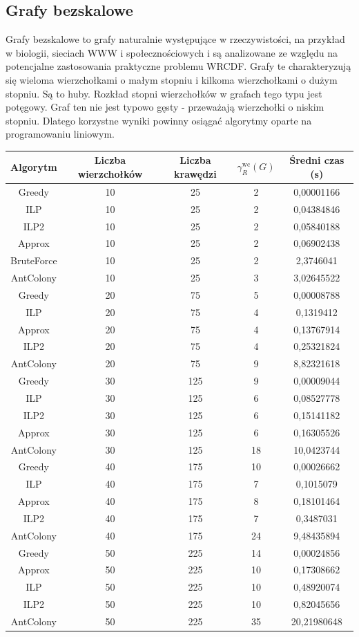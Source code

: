 \subsection{Grafy bezskalowe}

Grafy bezskalowe to grafy naturalnie występujące w rzeczywistości, na przykład w biologii, sieciach WWW i społecznościowych i są analizowane ze względu na potencjalne zastosowania praktyczne problemu WRCDF. Grafy te charakteryzują się wieloma wierzchołkami o małym stopniu i kilkoma wierzchołkami o dużym stopniu. Są to huby. Rozkład stopni wierzchołków w grafach tego typu jest potęgowy. Graf ten nie jest typowo gęsty - przeważają wierzchołki o niskim stopniu. Dlatego korzystne wyniki powinny osiągać algorytmy oparte na programowaniu liniowym.

\begin{table}[H]
    \centering
    \begin{tabular}{|c|c|c|c|c|}
    \hline
    Algorytm & Liczba wierzchołków & Liczba krawędzi & $\gamma^{\text{wc}}_R(G)$ & Średni czas (s) \\
    \hline
    Greedy & 10 & 25 & 2 & 0,00001166 \\
    ILP & 10 & 25 & 2 & 0,04384846 \\
    ILP2 & 10 & 25 & 2 & 0,05840188 \\
    Approx & 10 & 25 & 2 & 0,06902438 \\
    BruteForce & 10 & 25 & 2 & 2,3746041 \\
    AntColony & 10 & 25 & 3 & 3,02645522 \\
     \hline
     Greedy & 20 & 75 & 5 & 0,00008788 \\
     ILP & 20 & 75 & 4 & 0,1319412 \\
     Approx & 20 & 75 & 4 & 0,13767914 \\
     ILP2 & 20 & 75 & 4 & 0,25321824 \\
     AntColony & 20 & 75 & 9 & 8,82321618 \\ 
    \hline
    Greedy & 30 & 125 & 9 & 0,00009044 \\
    ILP & 30 & 125 & 6 & 0,08527778 \\
    ILP2 & 30 & 125 & 6 & 0,15141182 \\
    Approx & 30 & 125 & 6 & 0,16305526 \\
    AntColony & 30 & 125 & 18 & 10,0423744 \\ 
    \hline
    Greedy & 40 & 175 & 10 & 0,00026662 \\
    ILP & 40 & 175 & 7 & 0,1015079 \\
    Approx & 40 & 175 & 8 & 0,18101464 \\
    ILP2 & 40 & 175 & 7 & 0,3487031 \\
    AntColony & 40 & 175 & 24 & 9,48435894 \\
    \hline
    Greedy & 50 & 225 & 14 & 0,00024856 \\
    Approx & 50 & 225 & 10 & 0,17308662 \\
    ILP & 50 & 225 & 10 & 0,48920074 \\
    ILP2 & 50 & 225 & 10 & 0,82045656 \\
    AntColony & 50 & 225 & 35 & 20,21980648 \\
    

\end{tabular}
\end{table}
